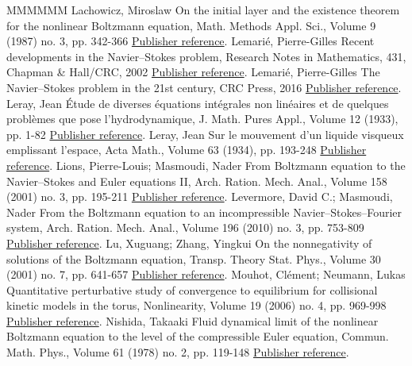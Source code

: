 \begin{thebibliography}{MMMMMM}
 Lachowicz, Miroslaw On the initial layer and the existence theorem for the nonlinear Boltzmann equation, Math. Methods Appl. Sci., Volume 9 (1987) no. 3, pp. 342-366 \href{https://ahl.centre-mersenne.org/item/AHL_2020__3__561_0/#Lachowicz}{Publisher reference}.
 Lemarié, Pierre-Gilles Recent developments in the Navier–Stokes problem, Research Notes in Mathematics, 431, Chapman \& Hall/CRC, 2002 \href{https://ahl.centre-mersenne.org/item/AHL_2020__3__561_0/#lemarie1}{Publisher reference}.
 Lemarié, Pierre-Gilles The Navier–Stokes problem in the 21st century, CRC Press, 2016 \href{https://ahl.centre-mersenne.org/item/AHL_2020__3__561_0/#lemarie2}{Publisher reference}.
 Leray, Jean Étude de diverses équations intégrales non linéaires et de quelques problèmes que pose l’hydrodynamique, J. Math. Pures Appl., Volume 12 (1933), pp. 1-82 \href{https://ahl.centre-mersenne.org/item/AHL_2020__3__561_0/#leray2D}{Publisher reference}.
 Leray, Jean Sur le mouvement d’un liquide visqueux emplissant l’espace, Acta Math., Volume 63 (1934), pp. 193-248 \href{https://ahl.centre-mersenne.org/item/AHL_2020__3__561_0/#leray}{Publisher reference}.
 Lions, Pierre-Louis; Masmoudi, Nader From Boltzmann equation to the Navier–Stokes and Euler equations II, Arch. Ration. Mech. Anal., Volume 158 (2001) no. 3, pp. 195-211 \href{https://ahl.centre-mersenne.org/item/AHL_2020__3__561_0/#lionsmasmoudi}{Publisher reference}.
 Levermore, David C.; Masmoudi, Nader From the Boltzmann equation to an incompressible Navier–Stokes–Fourier system, Arch. Ration. Mech. Anal., Volume 196 (2010) no. 3, pp. 753-809 \href{https://ahl.centre-mersenne.org/item/AHL_2020__3__561_0/#Levermore-Masmoudi}{Publisher reference}.
 Lu, Xuguang; Zhang, Yingkui On the nonnegativity of solutions of the Boltzmann equation, Transp. Theory Stat. Phys., Volume 30 (2001) no. 7, pp. 641-657 \href{https://ahl.centre-mersenne.org/item/AHL_2020__3__561_0/#luzhang}{Publisher reference}.
 Mouhot, Clément; Neumann, Lukas Quantitative perturbative study of convergence to equilibrium for collisional kinetic models in the torus, Nonlinearity, Volume 19 (2006) no. 4, pp. 969-998 \href{https://ahl.centre-mersenne.org/item/AHL_2020__3__561_0/#Mouhot-Neumann}{Publisher reference}.
 Nishida, Takaaki Fluid dynamical limit of the nonlinear Boltzmann equation to the level of the compressible Euler equation, Commun. Math. Phys., Volume 61 (1978) no. 2, pp. 119-148 \href{https://ahl.centre-mersenne.org/item/AHL_2020__3__561_0/#Nishida}{Publisher reference}.

\end{thebibliography}
